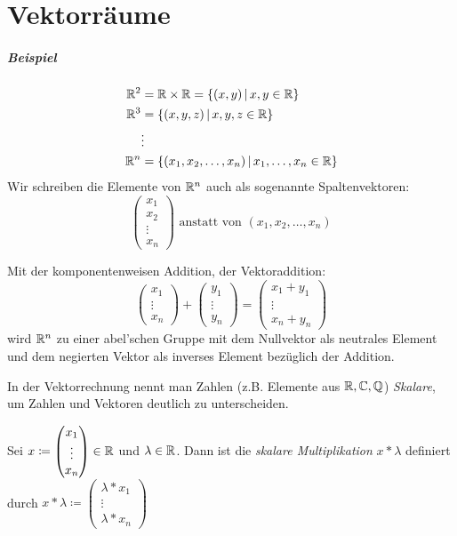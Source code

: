 \chapter{Vektorräume}
\paragraph{Beispiel}
\begin{align*}
  \mathbb{R}^2&=\mathbb{R}\times\mathbb{R}=\left\{ (x,y) \,\middle|\, x,y\in\mathbb{R} \right\}\\
  \mathbb{R}^3&=\left\{ (x,y,z) \,\middle|\, x,y,z\in\mathbb{R} \right\}\\
  &\vdots\\
  \mathbb{R}^n&=\left\{ (x_1,x_2,\ldots,x_n) \,\middle|\, x_1,\ldots,x_n\in\mathbb{R} \right\}\\
\end{align*}
Wir schreiben die Elemente von $\mathbb{R}^n$ auch als sogenannte Spaltenvektoren:
\begin{equation*}
  \begin{pmatrix}
    x_1\\
    x_2\\
    \vdots\\
    x_n
  \end{pmatrix} \text{ anstatt von } (x_1,x_2,\ldots,x_n)
\end{equation*}

Mit der komponentenweisen Addition, der Vektoraddition:
\begin{equation*}
  \begin{pmatrix}
    x_1\\
    \vdots\\
    x_n
  \end{pmatrix}
  +
  \begin{pmatrix}
    y_1\\
    \vdots\\
    y_n
  \end{pmatrix}
  =
  \begin{pmatrix}
    x_1+y_1\\
    \vdots\\
    x_n+y_n
  \end{pmatrix}
\end{equation*}
wird $\mathbb{R}^n$ zu einer abel'schen Gruppe mit dem Nullvektor als neutrales Element und dem negierten Vektor als inverses Element bezüglich der Addition.

In der Vektorrechnung nennt man Zahlen (z.B. Elemente aus $\mathbb{R},\mathbb{C},\mathbb{Q}$) \emph{Skalare}, um Zahlen und Vektoren deutlich zu unterscheiden.

Sei $x\coloneqq \begin{pmatrix}
  x_1\\
  \vdots\\
  x_n
\end{pmatrix} \in \mathbb{R}$ und $\lambda\in\mathbb{R}$. Dann ist die \emph{skalare Multiplikation} $x*\lambda$ definiert durch $x*\lambda \coloneqq \begin{pmatrix}
  \lambda* x_1\\
  \vdots\\
  \lambda* x_n
\end{pmatrix}$

